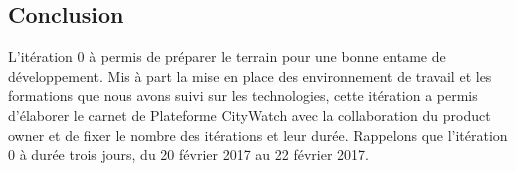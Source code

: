 \subsection{Conclusion}

L’itération 0 à permis de préparer le terrain pour une bonne entame de
développement. Mis à part la mise en place des environnement de travail et les
formations que nous avons suivi sur les technologies, cette itération a permis d’élaborer
le carnet de Plateforme CityWatch avec la collaboration du product owner et de fixer le
nombre des itérations et leur durée. Rappelons que l’itération 0 à durée trois jours,
du 20 février 2017 au 22 février 2017.
